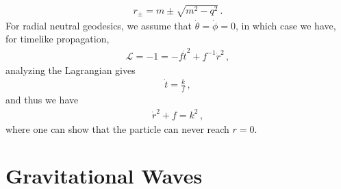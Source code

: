 \documentclass[11pt, onesided]{book}
\theoremstyle{break}
\theoremstyle{break}
\begin{document}
\begin{align*}
r_{\pm} = m \pm \sqrt{m^2 - q^2}\,.
\end{align*}
For radial neutral geodesics, we assume that $\dot{\theta} = \dot{\phi} = 0$, in which case we have, for timelike propagation, 
\begin{align*}
\mathcal{L} = -1 = -f\dot{t}^2 +f^{-1} \dot{r}^2\,, 
\end{align*}
analyzing the Lagrangian gives
\begin{align*}
\dot{t} = \frac{k}{f}\,,
\end{align*}
and thus we have
\begin{align*}
\dot{r}^2 + f = k^2\,,
\end{align*}
where one can show that the particle can never reach $r=0$. 




\chapter{Gravitational Waves}
\end{document}
